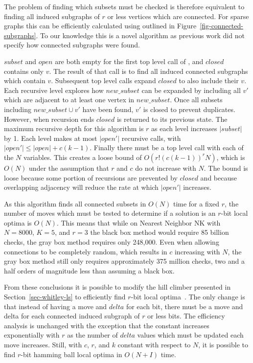 The problem of finding which subsets must be checked is therefore equivalent to
finding all induced subgraphs of $r$ or less vertices which are connected. For sparse
graphs this can be efficiently calculated using  outlined
in Figure~\ref{fig-connected-subgraphs}. To our knowledge this is a novel algorithm
as previous work did not specify how connected subgraphs were found.

$subset$ and $open$ are both empty for the first top level call of , and
$closed$ contains only $v$.
The result of that call is to find all induced connected subgraphs which contain $v$.
Subsequent top level calls expand $closed$ to also include their $v$.
Each recursive level explores how $new\_subset$ can be expanded by including all $v'$ which are adjacent
to at least one vertex in $new\_subset$. Once all subsets including $new\_subset \cup v'$ have been found,
$v'$ is closed to prevent duplicates. However, when recursion ends $closed$ is returned to its previous state.
The maximum recursive depth for this algorithm is $r$ as each level increases $|subset|$ by 1. Each level
makes at most $|open'|$ recursive calls, with $|open'| \leq |open| + c(k-1)$. Finally there must be a top level
call with each of the $N$ variables. This creates a loose bound of $O(r!(c(k-1))^rN)$, which is $O(N)$ under the
assumption that $r$ and $c$ do not increase with $N$. The bound is loose because some portion of recursions
are prevented by $closed$ and because overlapping adjacency will reduce the rate at which $|open'|$ increases.

As this algorithm finds all connected subsets in $O(N)$ time for a fixed $r$, the number of moves
which must be tested to determine if a solution is an $r$-bit local optima is $O(N)$. This means that
while on Nearest Neighbor NK with $N=8000$, $K=5$, and $r=3$ the black box method would require 85 billion
checks, the gray box method requires only 248,000. Even when allowing connections to be completely random,
which results in $c$ increasing with $N$, the gray box method still only requires approximately 375 million checks,
two and a half orders of magnitude less than assuming a black box.

From these conclusions it is possible to modify the hill climber presented in Section~\ref{sec-whitley-ls} to
efficiently find $r$-bit local optima~\cite{chicano:2014:ball}. The only change is that instead of having a move
and $delta$ for each bit, there must be a move and delta for each connected induced subgraph of $r$ or less bits.
The efficiency analysis is unchanged with the exception that the constant increases exponentially with $r$ as
the number of $delta$ values which must be updated each move increases. Still, with $c$, $r$, and $k$ constant
with respect to $N$, it is possible to find $r$-bit hamming ball local optima in $O(N+I)$ time.

